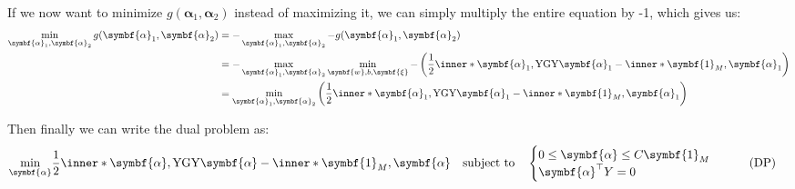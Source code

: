 If we now want to minimize \(g(\symbf{\alpha}_1,\symbf{\alpha}_2)\) instead of maximizing it, we can simply multiply the entire equation by -1, which gives us:
\begin{align*}
	\min_{\symbf{\alpha}_1, \symbf{\alpha}_2} g(\symbf{\alpha}_1,\symbf{\alpha}_2) & = -\max_{\symbf{\alpha}_1, \symbf{\alpha}_2} -g(\symbf{\alpha}_1,\symbf{\alpha}_2)                                                                                                                                             \\
	                                                                               & = -\max_{\symbf{\alpha}_1, \symbf{\alpha}_2} \min_{\symbf{w}, b, \symbf{\xi}} -\left(\frac{1}{2}\inner*{\symbf{\alpha}_1, \mathrm{Y} \mathrm{G} \mathrm{Y} \symbf{\alpha}_1} -  \inner*{\symbf{1}_M, \symbf{\alpha}_1} \right) \\
	                                                                               & = \min_{\symbf{\alpha}_1, \symbf{\alpha}_2} \left(\frac{1}{2}\inner*{\symbf{\alpha}_1, \mathrm{Y} \mathrm{G} \mathrm{Y} \symbf{\alpha}_1} -  \inner*{\symbf{1}_M, \symbf{\alpha}_1} \right)
\end{align*}

Then finally we can write the dual problem as:
\begin{align}\label{eq:dual-problem}
	\min_{\symbf{\alpha}} & \frac{1}{2} \inner*{\symbf{\alpha}, \mathrm{Y} \mathrm{G} \mathrm{Y} \symbf{\alpha}} -  \inner*{\symbf{1}_M, \symbf{\alpha}}
	\quad
	\text{subject to}
	\quad
	\begin{cases}
		0 \leq \symbf{\alpha} \leq C\symbf{1}_M \\
		\symbf{\alpha}^\top Y = 0
	\end{cases}\tag{DP}
\end{align}



